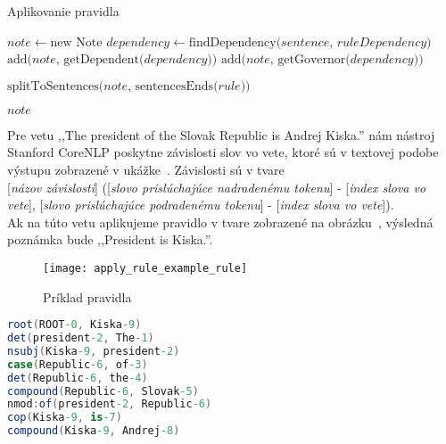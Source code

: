 \begin{algorithm}
	\caption[Aplikovanie pravidla]{Aplikovanie pravidla}\label{alg:applying_rule}
	\begin{algorithmic}[1]
		\State $note \gets \text{new Note}$
		\State $dependency \gets \text{findDependency(} sentence \text{, } ruleDependency \text{)}$
		\State $\text{add(} note \text{, getDependent(} dependency \text{))}$
		\State $\text{add(} note \text{, getGovernor(} dependency \text{))}$
		\EndIf
		\EndIf
		\EndFor
		
		\State $\text{splitToSentences(} note \text{, sentencesEnds(} rule \text{))}$	
		
		\Return $note$
		\EndProcedure
	\end{algorithmic}
\end{algorithm}

Pre vetu ,,The president of the Slovak Republic is Andrej Kiska.'' nám nástroj Stanford CoreNLP poskytne závislosti slov vo vete, ktoré sú v textovej podobe výstupu zobrazené v ukážke~. Závislosti sú v tvare\\ 

[\textit{názov závislosti}] ([\textit{slovo prislúchajúce nadradenému tokenu}] - [\textit{index slova vo vete}], [\textit{slovo prislúchajúce podradenému tokenu}] - [\textit{index slova vo vete}]).\\

Ak na túto vetu aplikujeme pravidlo v tvare zobrazené na obrázku~, výsledná poznámka bude ,,President is Kiska.''. \\

\begin{figure}[H]
	\begin{center}\texttt{[image: apply\_rule\_example\_rule]}\end{center}
	\caption[Príklad pravidla]{Príklad pravidla}\label{fig:apply_rule_example_rule}
\end{figure}

\begin{lstlisting}[language = csharp, caption={Závislosti jednoduchej vety}, label = {code:sentence_dependencies}]
root(ROOT-0, Kiska-9)
det(president-2, The-1)
nsubj(Kiska-9, president-2)
case(Republic-6, of-3)
det(Republic-6, the-4)
compound(Republic-6, Slovak-5)
nmod:of(president-2, Republic-6)
cop(Kiska-9, is-7)
compound(Kiska-9, Andrej-8)
\end{lstlisting}

